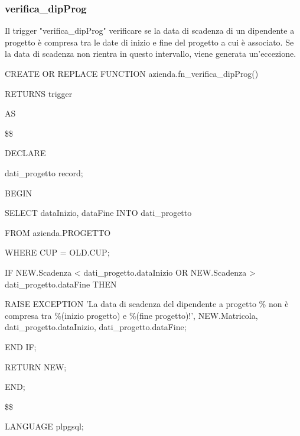     \subsubsection{verifica\_dipProg}
    Il trigger "verifica\_dipProg" verificare se la data di scadenza di un dipendente a progetto è compresa tra le date di inizio e fine del progetto a cui è associato. Se la data di scadenza non rientra in questo intervallo, viene generata un'eccezione.
    \ttfamily
        \begin{flushleft}
            \begin{description}
                \item CREATE OR REPLACE FUNCTION azienda.fn\_verifica\_dipProg()  
                \item RETURNS trigger
                \item AS
                \item \$\$
                \item DECLARE
                \begin{description}
                    \item dati\_progetto record;
                \end{description}
                \item BEGIN 
                \begin{description}
                    \item SELECT dataInizio, dataFine INTO dati\_progetto
                    \item FROM azienda.PROGETTO
                    \item WHERE CUP = OLD.CUP;
                
                    \vspace{0.5cm}

                    \item IF NEW.Scadenza < dati\_progetto.dataInizio OR NEW.Scadenza > dati\_progetto.dataFine THEN
                    \begin{description}    
                        \item RAISE EXCEPTION 'La data di scadenza del dipendente a progetto \% non è compresa tra \%(inizio progetto) e \%(fine progetto)!', NEW.Matricola, dati\_progetto.dataInizio, dati\_progetto.dataFine;
                    \end{description}
                    \item END IF;
                    \item 
                    \item RETURN NEW; 

                \end{description}

                \item END;
                \item \$\$
                \item LANGUAGE plpgsql;
            \end{description}
        \end{flushleft}
    \normalfont

